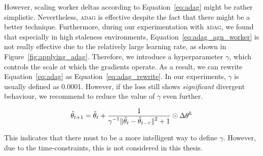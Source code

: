 However, scaling worker deltas according to Equation~\ref{eq:adag} might be rather simplistic. Nevertheless, \textsc{adag} is effective despite the fact that there might be a better technique. Furthermore, during our experimentation with \textsc{adag}, we found that especially in high staleness environments, Equation~\ref{eq:adag_agn_worker} is not really effective due to the relatively large learning rate, as shown in Figure~\ref{fig:applying_adag}. Therefore, we introduce a hyperparameter $\gamma$, which controls the scale at which the gradients operate. As a result, we can rewrite Equation~\ref{eq:adag} as Equation~\ref{eq:adag_rewrite}. In our experiments, $\gamma$ is usually defined as 0.0001. However, if the loss still shows \emph{significant} divergent behaviour, we recommend to reduce the value of $\gamma$ even further.

\begin{equation}
  \label{eq:adag_rewrite}
  \tilde{\theta}_{t+1} = \tilde{\theta}_t + \frac{\displaystyle 1}{\displaystyle \gamma^{-1}\|\tilde{\theta}_t - \tilde{\theta}_{t - \tau}\|^2 + 1} \odot \Delta\theta^k
\end{equation}

This indicates that there must to be a more intelligent way to define $\gamma$. However, due to the time-constraints, this is not considered in this thesis.

